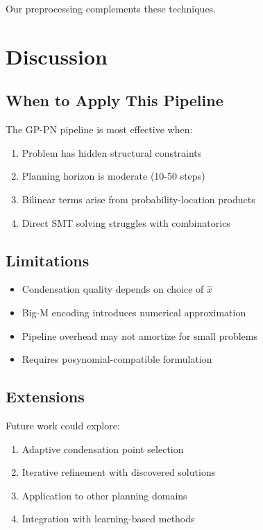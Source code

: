 \documentclass[11pt]{article}
\begin{document}
Our preprocessing complements these techniques.

\section{Discussion}

\subsection{When to Apply This Pipeline}

The GP-PN pipeline is most effective when:
\begin{enumerate}
    \item Problem has hidden structural constraints
    \item Planning horizon is moderate (10-50 steps)
    \item Bilinear terms arise from probability-location products
    \item Direct SMT solving struggles with combinatorics
\end{enumerate}

\subsection{Limitations}

\begin{itemize}
    \item Condensation quality depends on choice of $\hat{x}$
    \item Big-M encoding introduces numerical approximation
    \item Pipeline overhead may not amortize for small problems
    \item Requires posynomial-compatible formulation
\end{itemize}

\subsection{Extensions}

Future work could explore:
\begin{enumerate}
    \item Adaptive condensation point selection
    \item Iterative refinement with discovered solutions
    \item Application to other planning domains
    \item Integration with learning-based methods
\end{enumerate}
\end{document}
